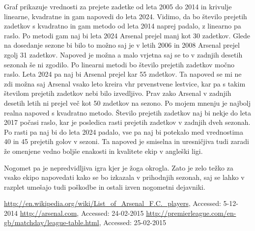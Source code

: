 \documentclass[11pt,a4paper]{article}
\begin{document}

Graf prikazuje vrednosti za prejete zadetke od leta 2005 do 2014 in krivulje linearne, kvadratne in gam napovedi do leta 2024. Vidimo, da bo število prejetih zadetkov s kvadratno in gam metodo od leta 2014 naprej padalo, z linearno pa raslo. Po metodi gam naj bi leta 2024 Arsenal prejel manj kot 30 zadetkov. Glede na dosedanje sezone bi bilo to možno saj je v letih 2006 in 2008 Arsenal prejel zgolj 31 zadetkov. Napoved je možna a malo vrjetna saj se to v zadnjih desetih sezonah še ni zgodilo. Po linearni metodi bo število prejetih zadetkov močno raslo. Leta 2024 pa naj bi Arsenal prejel kar 55 zadetkov. Ta napoved se mi ne zdi možna saj Arsenal vsako leto kreira vhr prvenstvene lestvice, kar pa s takim številom prejetih zadetkov nebi bilo izvedljivo. Prav zako Arsenal v zadnjih desetih letih ni prejel več kot 50 zadetkov na sezono. Po mojem mnenju je najbolj realna napoved s kvadratno metodo. Število prejetih zadetkov naj bi nekje do leta 2017 počasi raslo, kar je posledica rasti prejetih zadetkov v zadnjih dveh sezonah. Po rasti pa naj bi do leta 2024 padalo, vse pa naj bi potekalo med vrednostima 40 in 45 prejetih golov v sezoni. Ta napoved je smiselna in uresničjiva tudi zaradi že omenjene vedno boljše enakosti in  kvalitete ekip v angleški ligi. 

Nogomet pa je nepredvidljiva igra kjer je žoga okrogla. Zato je zelo težko za vsako ekipo napovedati kako se bo izkazala v prihodnjih sezonah, saj se lahko v razplet umešajo tudi poškodbe in ostali izven nogometni dejavniki.

\begin{thebibliography}{9}

  \url{http://en.wikipedia.org/wiki/List_of_Arsenal_F.C._players},
  {Accessed: 5-12-2014}
  \url{http://arsenal.com},
  {Accessed: 24-02-2015}
  \url{http://premierleague.com/en-gb/matchday/league-table.html},
  {Accessed: 25-02-2015}

\end{thebibliography}
  
\end{document}
